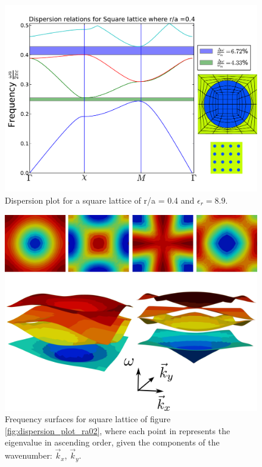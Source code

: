 \begin{figure}
\centering
\includegraphics[scale=0.6]{./img/square_lattice_ra04.pdf}
\caption{Dispersion plot for a square lattice of r/a = 0.4 and $\epsilon_r = 8.9$.}
\label{fig:dispersion_plot_ra04}
\end{figure}

\begin{figure}
\centering
\includegraphics[scale=0.1]{./img/energy_surfaces.pdf}
\caption{Frequency surfaces for square lattice of figure \ref{fig:dispersion_plot_ra02}, where each point in  represents the eigenvalue in ascending order, given the components of the wavenumber: $\vec{k}_x$, $\vec{k}_y$.}
\label{fig:frequency_surfaces}
\end{figure}
